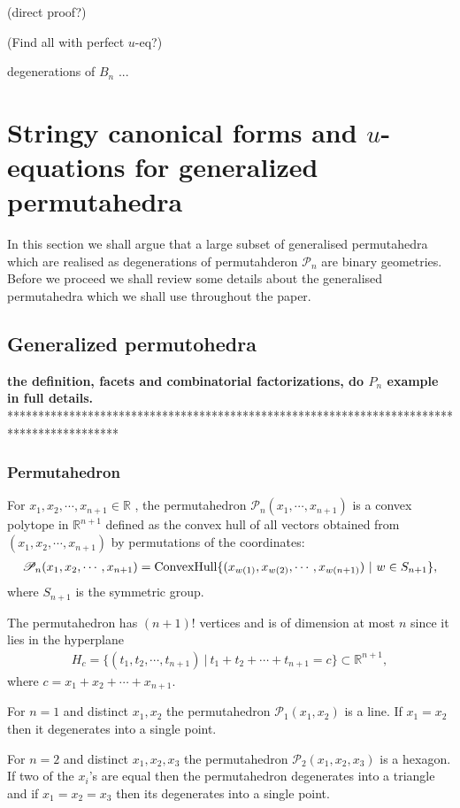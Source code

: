 \documentclass[hidelinks,12pt]{article}
\newcommand{\bea}[1]{\begin{eqnarray}\label{#1} }
\newcommand{\eea}{\end{eqnarray}}
\def\bea{\begin{eqnarray}}
\def\eea{\end{eqnarray}}
\begin{document}
(direct proof?)

(Find all with perfect $u$-eq?)

degenerations of $B_n$ ...


\section{Stringy canonical forms and $u$-equations for generalized permutahedra}
In this section we shall argue that  a large subset of generalised permutahedra which are realised as degenerations of permutahderon ${\mathscr P_n}$ are binary geometries. Before we proceed we shall review some details about the generalised permutahedra which we shall use throughout the paper.
\subsection{Generalized permutohedra} {\bf the definition, facets and combinatorial factorizations, do $P_n$ example in full details.}
******************************************************************************************
\subsubsection*{Permutahedron}
 For $x_1,x_2, \cdots, x_{n+1} \in \mathbb{R} $ , the permutahedron ${\mathscr P_n}(x_1,\cdots,x_{n+1})$ is a convex polytope in $\mathbb{R}^{n+1}$ defined as the convex hull of all vectors obtained from $(x_1,x_2, \cdots, x_{n+1})$ by permutations of the coordinates:
 \bea
{\mathscr P_n}(x_1,x_2, \cdots, x_{n+1}) = {\rm ConvexHull} \{ (x_{w(1)},x_{w(2)}, \cdots, x_{w(n+1)})~ |~ w \in S_{n+1} \}, \nonumber
 \eea
 where $S_{n+1}$ is the symmetric group. 
 
 The permutahedron has $(n+1)!$ vertices and is of dimension at most $n$ since it lies in the hyperplane 
 \bea
 H_c= \{(t_1,t_2, \cdots, t_{n+1}) ~|~ t_1 + t_2 + \cdots + t_{n+1}= c \} \subset \mathbb{R}^{n+1}, \nonumber
 \eea
where $c= x_1+x_2+ \cdots +x_{n+1}$.

For $n=1$ and distinct $x_1,x_2$ the permutahedron ${\mathscr P_1}(x_1,x_2)$ is a line. If  $x_1=x_2$ then it degenerates into a single point.

For $n=2$ and distinct $x_1,x_2, x_3$ the permutahedron ${\mathscr P_2}(x_1,x_2, x_3)$ is a hexagon. If two of the $x_i$'s are equal then the permutahedron degenerates into a triangle and if $x_1= x_2 = x_3$ then its degenerates into a single point.
\end{document}
